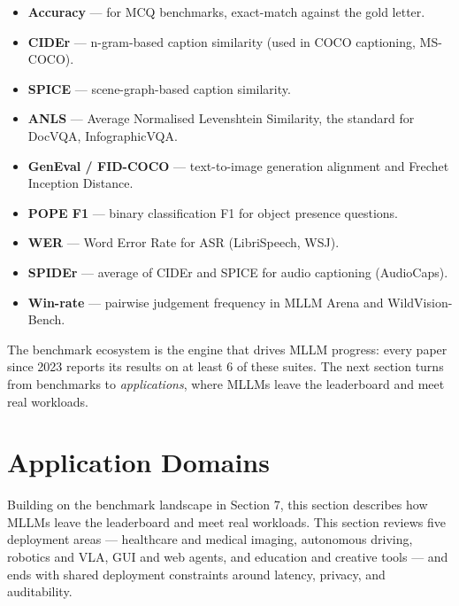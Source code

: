 \begin{itemize}
\tightlist
\item
  \textbf{Accuracy} --- for MCQ benchmarks, exact-match against the gold letter.
\item
  \textbf{CIDEr} --- n-gram-based caption similarity (used in COCO captioning, MS-COCO).
\item
  \textbf{SPICE} --- scene-graph-based caption similarity.
\item
  \textbf{ANLS} --- Average Normalised Levenshtein Similarity, the standard for DocVQA, InfographicVQA.
\item
  \textbf{GenEval / FID-COCO} --- text-to-image generation alignment and Frechet Inception Distance.
\item
  \textbf{POPE F1} --- binary classification F1 for object presence questions.
\item
  \textbf{WER} --- Word Error Rate for ASR (LibriSpeech, WSJ).
\item
  \textbf{SPIDEr} --- average of CIDEr and SPICE for audio captioning (AudioCaps).
\item
  \textbf{Win-rate} --- pairwise judgement frequency in MLLM Arena and WildVision-Bench.
\end{itemize}

The benchmark ecosystem is the engine that drives MLLM progress: every paper since 2023 reports its results on at least 6 of these suites. The next section turns from benchmarks to \emph{applications}, where MLLMs leave the leaderboard and meet real workloads.

\section{Application Domains}\label{application-domains}

Building on the benchmark landscape in Section 7, this section describes how MLLMs leave the leaderboard and meet real workloads. This section reviews five deployment areas --- healthcare and medical imaging, autonomous driving, robotics and VLA, GUI and web agents, and education and creative tools --- and ends with shared deployment constraints around latency, privacy, and auditability.

